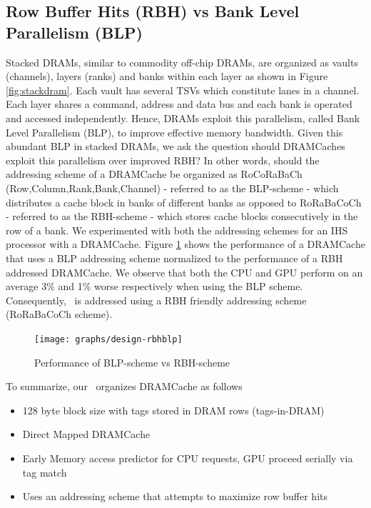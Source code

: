 \subsection{Row Buffer Hits (RBH) vs Bank Level Parallelism (BLP)} 

Stacked DRAMs, similar to commodity off-chip DRAMs, are organized as vaults (channels), layers (ranks) and banks within each layer as shown in Figure \ref{fig:stackdram}. Each vault has several TSVs which constitute lanes in a channel. Each layer shares a command, address and data bus and each bank is  operated and accessed independently. Hence, DRAMs exploit this parallelism, called Bank Level Parallelism (BLP), to improve effective memory bandwidth. Given this abundant BLP in stacked DRAMs, we ask the question should DRAMCaches exploit this parallelism over improved RBH? In other words, should the addressing scheme of a DRAMCache be organized as RoCoRaBaCh (Row,Column,Rank,Bank,Channel) - referred to as the BLP-scheme - which distributes a cache block in banks of different banks as opposed to RoRaBaCoCh - referred to as the RBH-scheme - which stores cache blocks consecutively in the row of a bank. We experimented with both the addressing schemes for an IHS processor with a DRAMCache. Figure \ref{fig:design-rbhblp} shows the performance of a DRAMCache that uses a BLP addressing scheme normalized to the performance of a RBH addressed DRAMCache. We observe that both the CPU and GPU perform on an average 3\% and 1\% worse respectively when using the BLP scheme. Consequently, \cachename\ is addressed using a RBH friendly addressing scheme (RoRaBaCoCh scheme). 

\begin{figure}[!htb]
	\centering
	\texttt{[image: graphs/design-rbhblp]}
	\caption{Performance of BLP-scheme vs RBH-scheme}
	\label{fig:design-rbhblp}
\end{figure}

\par To summarize, our \cachename\ organizes DRAMCache as follows
\begin{itemize}
	\setlength\itemsep{0.5em}
	\item 128 byte block size with tags stored in DRAM rows (tags-in-DRAM)
	\item Direct Mapped DRAMCache
	\item Early Memory access predictor for CPU requests, GPU proceed serially via tag match
	\item Uses an addressing scheme that attempts to maximize row buffer hits
\end{itemize}


